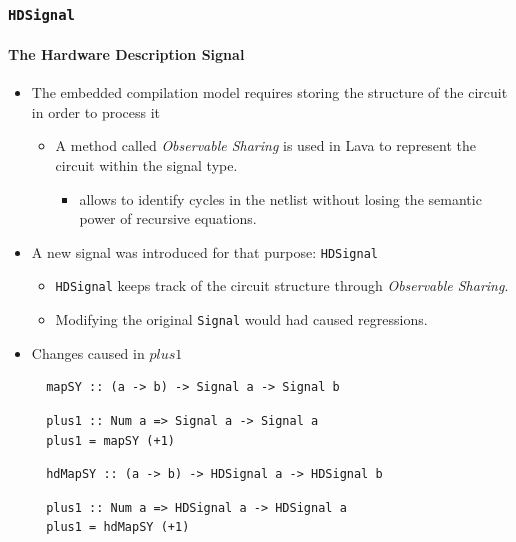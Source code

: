 \documentclass{beamer}
\begin{document}
\begin{frame}[fragile]
  \frametitle{\texttt{HDSignal}}
  \framesubtitle{The Hardware Description Signal}
  \begin{itemize}
    
  \item The embedded compilation model requires storing the structure of the
    circuit in order to process it
    \begin{itemize}
    \item A method called \textit{Observable Sharing} is used in Lava to
      represent the circuit within the signal type.
      \pause
      \begin{itemize}
      \item allows to identify
        cycles in the netlist without losing the semantic power of recursive
        equations.
      \end{itemize}
    \end{itemize}
    \pause
  \item A new signal was introduced for that purpose: \texttt{HDSignal}
    \begin{itemize}
    \item \texttt{HDSignal} keeps track of the circuit structure through
      \textit{Observable Sharing}.
    \item Modifying the original \texttt{Signal} would had caused regressions.
    \end{itemize}
    \pause
  \item Changes caused in $\mathit{plus1}$
\pause
\begin{overprint}
\begin{lstlisting}
  mapSY :: (a -> b) -> Signal a -> Signal b
\end{lstlisting}
\begin{lstlisting}
  plus1 :: Num a => Signal a -> Signal a
  plus1 = mapSY (+1)
\end{lstlisting}
\begin{lstlisting}
  hdMapSY :: (a -> b) -> HDSignal a -> HDSignal b
\end{lstlisting}
\begin{lstlisting}
  plus1 :: Num a => HDSignal a -> HDSignal a
  plus1 = hdMapSY (+1)
\end{lstlisting}

\end{overprint}

    
\end{itemize}  
\end{frame}
\end{document}
